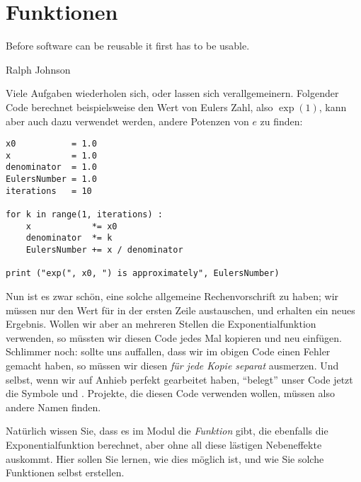 \chapter{Funktionen}
\label{chp:Funcs}
\epigraph{
	Before software can be reusable it first has to be usable.
}{Ralph Johnson}

Viele Aufgaben wiederholen sich, oder lassen sich verallgemeinern. Folgender Code berechnet beispielsweise den Wert von Eulers Zahl, also $\exp(1)$, kann aber auch dazu verwendet werden, andere Potenzen von $e$ zu finden:

\begin{codebox}
\begin{verbatim}
x0           = 1.0
x            = 1.0
denominator  = 1.0
EulersNumber = 1.0
iterations   = 10

for k in range(1, iterations) :
    x            *= x0
    denominator  *= k
    EulersNumber += x / denominator

print ("exp(", x0, ") is approximately", EulersNumber)
\end{verbatim}
\end{codebox}

Nun ist es zwar schön, eine solche allgemeine Rechenvorschrift zu haben; wir müssen nur den Wert für  in der ersten Zeile austauschen, und erhalten ein neues Ergebnis. Wollen wir aber an mehreren Stellen die Exponentialfunktion verwenden, so müssten wir diesen Code jedes Mal kopieren und neu einfügen. Schlimmer noch: sollte uns auffallen, dass wir im obigen Code einen Fehler gemacht haben, so müssen wir diesen \emph{für jede Kopie separat} ausmerzen. Und selbst, wenn wir auf Anhieb perfekt gearbeitet haben, \enquote{belegt} unser Code jetzt \ua die Symbole  und . Projekte, die diesen Code verwenden wollen, müssen also andere Namen finden.

Natürlich wissen Sie, dass es im Modul  die \emph{Funktion}  gibt, die ebenfalls die Exponentialfunktion berechnet, aber ohne all diese lästigen Nebeneffekte auskommt. Hier sollen Sie lernen, wie dies möglich ist, und wie Sie solche Funktionen selbst erstellen.


